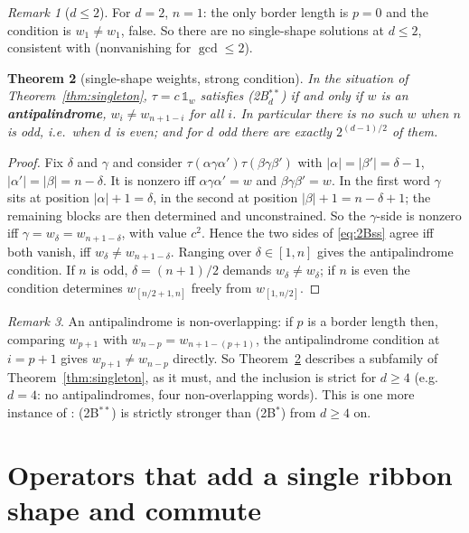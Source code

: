 \documentclass[11pt]{article}
\newtheorem{theorem}{Theorem}[section]
\theoremstyle{definition}
\theoremstyle{remark}
\newtheorem{remark}[theorem]{Remark}
\newcommand{\one}{\mathbb{1}}
\begin{document}
\begin{remark}[$d\le2$]
For $d=2$, $n=1$: the only border length is $p=0$ and the condition is $w_1\ne w_1$, false.
So there are no single-shape solutions at $d\le2$, consistent with
\cite[Thm.~6.1]{Q150c1} (nonvanishing for $\gcd\le2$).
\end{remark}

\begin{theorem}[single-shape weights, strong condition]\label{thm:singleton2}
In the situation of Theorem~\ref{thm:singleton}, $\tau=c\,\one_w$ satisfies
\textnormal{(2B$^{**}_d$)} if and only if $w$ is an \textbf{antipalindrome},
$w_i\ne w_{n+1-i}$ for all $i$.  In particular there is no such $w$ when $n$ is odd, i.e.\ when
$d$ is even; and for $d$ odd there are exactly $2^{(d-1)/2}$ of them.
\end{theorem}

\begin{proof}
Fix $\delta$ and $\gamma$ and consider $\tau(\alpha\gamma\alpha')\tau(\beta\gamma\beta')$ with
$|\alpha|=|\beta'|=\delta-1$, $|\alpha'|=|\beta|=n-\delta$.  It is nonzero iff
$\alpha\gamma\alpha'=w$ and $\beta\gamma\beta'=w$.  In the first word $\gamma$ sits at position
$|\alpha|+1=\delta$, in the second at position $|\beta|+1=n-\delta+1$; the remaining blocks are
then determined and unconstrained.  So the $\gamma$-side is nonzero iff
$\gamma=w_\delta=w_{n+1-\delta}$, with value $c^2$.  Hence the two sides of \eqref{eq:2Bss}
agree iff both vanish, iff $w_\delta\ne w_{n+1-\delta}$.  Ranging over $\delta\in[1,n]$ gives
the antipalindrome condition.  If $n$ is odd, $\delta=(n+1)/2$ demands $w_\delta\ne w_\delta$;
if $n$ is even the condition determines $w_{[n/2+1,n]}$ freely from $w_{[1,n/2]}$.
\end{proof}

\begin{remark}
An antipalindrome is non-overlapping: if $p$ is a border length then, comparing
$w_{p+1}$ with $w_{n-p}=w_{n+1-(p+1)}$, the antipalindrome condition at $i=p+1$ gives
$w_{p+1}\ne w_{n-p}$ directly.  So Theorem~\ref{thm:singleton2} describes a subfamily of
Theorem~\ref{thm:singleton}, as it must, and the inclusion is strict for $d\ge4$
(e.g.\ $d=4$: no antipalindromes, four non-overlapping words).  This is one more instance of
\cite[Rem.~5.2]{Q150c1}: (2B$^{**}$) is strictly stronger than (2B$^*$) from $d\ge4$ on.
\end{remark}

\section{Operators that add a single ribbon shape and commute}\label{sec:counter}
\end{document}
